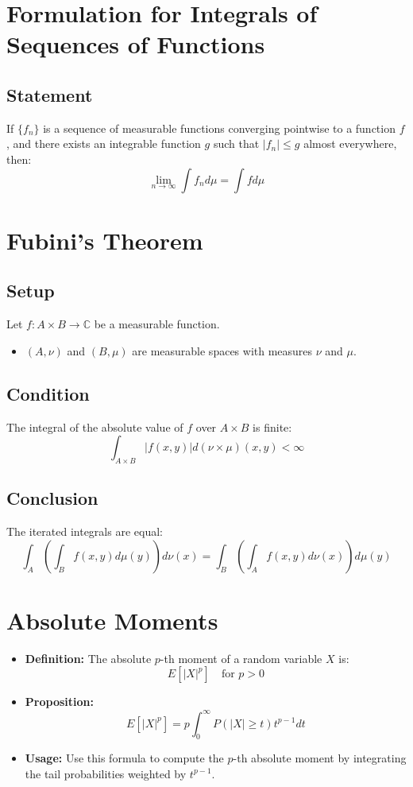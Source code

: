 \documentclass{article}
\begin{document}
\section*{Formulation for Integrals of Sequences of Functions}

\subsection*{Statement}
If $\{f_n\}$ is a sequence of measurable functions converging pointwise to a function $f$, and there exists an integrable function $g$ such that $|f_n| \leq g$ almost everywhere, then:
\[
\lim_{n \to \infty} \int f_n d\mu = \int f d\mu
\]

\section*{Fubini's Theorem}

\subsection*{Setup}
Let \( f : A \times B \to \mathbb{C} \) be a measurable function.
\begin{itemize}
    \item $(A, \nu)$ and $(B, \mu)$ are measurable spaces with measures $\nu$ and $\mu$.
\end{itemize}

\subsection*{Condition}
The integral of the absolute value of $f$ over $A \times B$ is finite:
\[
\int_{A \times B} |f(x, y)| d(\nu \times \mu)(x, y) < \infty
\]

\subsection*{Conclusion}
The iterated integrals are equal:
\[
\int_A \left( \int_B f(x, y) d\mu(y) \right) d\nu(x) = \int_B \left( \int_A f(x, y) d\nu(x) \right) d\mu(y)
\]


\section*{Absolute Moments}
\begin{itemize}
    \item \textbf{Definition:} The absolute $p$-th moment of a random variable $X$ is: 
    \[
    E[|X|^p] \quad \text{for } p > 0
    \]
    \item \textbf{Proposition:}
    \[
    E[|X|^p] = p \int_0^{\infty} P(|X| \ge t) t^{p-1} dt
    \]
    \item \textbf{Usage:} Use this formula to compute the $p$-th absolute moment by integrating the tail probabilities weighted by $t^{p-1}$.
\end{itemize}
\end{document}
